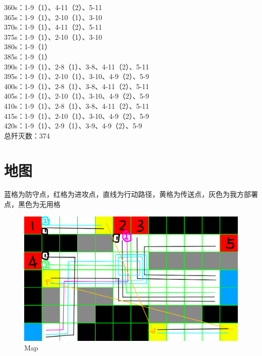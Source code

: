 \documentclass[a4paper,12pt]{article}
\begin{document}
		\indent 360s：1-9（1）、4-11（2）、5-11\\
		\indent 365s：1-9（1）、2-10（1）、3-10\\
		\indent 370s：1-9（1）、4-11（2）、5-11\\
		\indent 375s：1-9（1）、2-10（1）、3-10\\
		\indent 380s：1-9（1）\\
		\indent 385s：1-9（1）\\
		\indent 390s：1-9（1）、2-8（1）、3-8、4-11（2）、5-11\\
		\indent 395s：1-9（1）、2-10（1）、3-10、4-9（2）、5-9\\
		\indent 400s：1-9（1）、2-8（1）、3-8、4-11（2）、5-11\\
		\indent 405s：1-9（1）、2-10（1）、3-10、4-9（2）、5-9\\
		\indent 410s：1-9（1）、2-8（1）、3-8、4-11（2）、5-11\\
		\indent 415s：1-9（1）、2-10（1）、3-10、4-9（2）、5-9\\
		\indent 420s：1-9（1）、2-9（1）、3-9、4-9（2）、5-9\\
		\indent 总歼灭数：374
	\section{地图}
		蓝格为防守点，红格为进攻点，直线为行动路径，黄格为传送点，灰色为我方部署点，黑色为无用格
	\begin{figure}[p]
		\centering
		\includegraphics[width=1\textwidth]{map3}
		\caption{Map}
	\end{figure}
\end{document}
